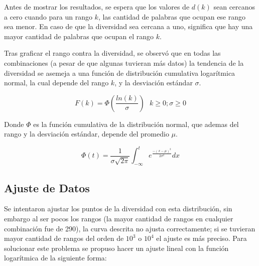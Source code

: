 Antes de mostrar los resultados, se espera  que los valores de $d(k)$ sean cercanos a cero cuando  para un rango $k$, las cantidad de palabras que ocupan ese rango sea menor. En caso de que la diversidad sea cercana a uno,  significa que hay una mayor cantidad de palabras que ocupan el rango $k$. 


Tras graficar el rango contra la diversidad, se observó que en todas las combinaciones (a pesar de que algunas tuvieran más datos)  la tendencia de la diversidad  se asemeja a una función de distribución cumulativa logarítmica  normal, la cual depende del rango $k$, y la desviación estándar $\sigma$.

\begin{equation}
	\label{ec.cumulativa}
	F(k) = \Phi \left ( \frac{ln(k)}{\sigma} \right )\,\,\,\,k\geq 0; \sigma \geq 0
\end{equation}

Donde $\Phi$ es la función cumulativa de la distribución normal, que ademas del rango y la desviación estándar, depende del promedio $\mu$.

\begin{equation}
	\label{ec.distribucionnormal}
	\Phi(t) = \frac{1}{\sigma\sqrt{2\pi}} \int_{-\infty}^{t}  e^{ \frac{ - \left ( x-\mu \right )^{2}}{2\sigma^2}  } dx	
\end{equation}



\subsection{Ajuste de Datos}


Se intentaron ajustar los puntos de la diversidad con esta distribución, sin embargo al ser pocos los rangos (la mayor cantidad de rangos en cualquier combinación fue de 290),  la curva descrita  no ajusta correctamente;  si se tuvieran mayor cantidad de rangos del orden de $10^{3}$ o $10^{4}$ el ajuste es más preciso.  Para solucionar este problema se propuso hacer un ajuste lineal con la función logarítmica  de la siguiente forma:


